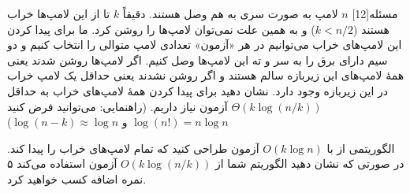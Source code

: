 ‌مسئله[12] $n$ لامپ به صورت سری به هم وصل هستند. دقیقاً $k$ تا از این لامپ‌ها خراب هستند ($k<n/2$) و به همین علت نمی‌توان لامپ‌ها را روشن کرد. ما برای پیدا کردن این لامپ‌های خراب می‌توانیم در هر «آزمون» تعدادی لامپ متوالی را انتخاب کنیم و دو سیم دارای برق را به سر و ته این لامپ‌ها وصل کنیم. اگر لامپ‌ها روشن شدند یعنی همۀ لامپ‌های این زیربازه سالم هستند و اگر روشن نشدند یعنی حداقل یک لامپ خراب در این زیربازه وجود دارد.
 نشان دهید برای پیدا کردن همۀ لامپ‌های خراب به حداقل $\Theta(k\log (n/k))$ آزمون نیاز داریم. (راهنمایی: می‌توانید فرض کنید $\log (n!) = n\log n$ و $\log(n-k)\approx \log n$)

 الگوریتمی از با $O(k\log n)$ آزمون طراحی کنید که تمام لامپ‌های خراب را پیدا کند. در صورتی که نشان دهید الگوریتم شما از $O(k\log (n/k))$ آزمون استفاده می‌کند ۵ نمره اضافه کسب خواهید کرد.














